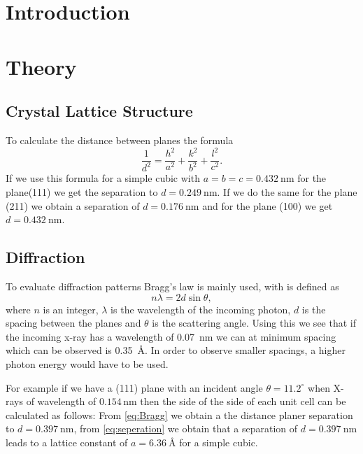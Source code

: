\section{Introduction}

\section{Theory}
\cite{hofmann2015}

\subsection{Crystal Lattice Structure}

To calculate the distance between planes the formula 
\begin{equation}
\frac{1}{d^2}=\frac{h^2}{a^2}+\frac{k^2}{b^2}+\frac{l^2}{c^2}.
\label{eq:seperation}
\end{equation}
If we use this formula for a simple cubic with $a=b=c=\SI{0.432}{\nano\m}$ for the plane(111) we get the separation to $d=\SI{0.249}{\nano\m}$. If we do the same for the plane (211) we obtain a separation of $d=\SI{0.176}{\nano\m}$ and for the plane (100) we get $d=\SI{0.432}{\nano\m}$. 



\subsection{Diffraction}

To evaluate diffraction patterns Bragg's law is mainly used, with is defined as
\begin{equation}
    n\lambda=2d\sin \theta,
    \label{eq:Bragg}
\end{equation}
where $n$ is an integer, $\lambda$ is the wavelength of the incoming photon, $d$ is the spacing between the planes and $\theta$ is the scattering angle. Using this we see that if the incoming x-ray has a wavelength of \SI{0.07}{\nano\m} we can at minimum spacing which can be observed is \SI{0.35}{\angstrom}. In order to observe smaller spacings, a higher photon energy would have to be used. 

For example if we have a (111) plane with an  incident angle \( \theta = 11.2^\circ \) when X-rays of wavelength of \( 0.154 \, \text{nm} \) then the side of the side of each unit cell can be calculated as follows: From \autoref{eq:Bragg} we obtain a the distance planer separation to $d=\SI{0.397}{\nano\m}$, from \autoref{eq:seperation} we obtain that a separation of $d=\SI{0.397}{\nano\m}$ leads to a lattice constant of $a=\SI{6.36}{\angstrom}$ for a simple cubic. 

